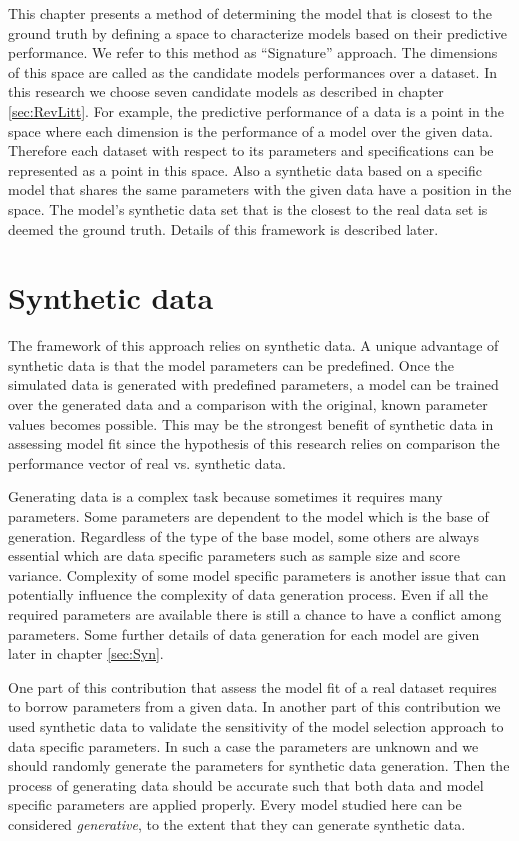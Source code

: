 \label{sec:Approach}

This chapter presents a method of determining the model that is closest to the ground truth by defining a space to characterize models based on their predictive performance. We refer to this method as ``Signature'' approach. The dimensions of this space are called as the candidate models performances over a dataset. In this research we choose seven candidate models as described in chapter \ref{sec:RevLitt}. For example, the predictive performance of a data is a point in the space where each dimension is the performance of a model over the given data. Therefore each dataset with respect to its parameters and specifications can be represented as a point in this space. Also a synthetic data based on a specific model that shares the same parameters with the given data have a position in the space.  The model's synthetic data set that is the closest to the real data set is deemed the ground truth.  Details of this framework is described later. 

\section{Synthetic data}
The framework of this approach relies on synthetic data. A unique advantage of synthetic data is that the model parameters can be predefined. Once the simulated data is generated with predefined parameters, a model can be trained over the generated data and a comparison with the original, known parameter values becomes possible. This may be the strongest benefit of synthetic data in assessing model fit since the hypothesis of this research relies on comparison the performance vector of real vs. synthetic data.

Generating data is a complex task because sometimes it requires many parameters. Some parameters are dependent to the model which is the base of generation. Regardless of the type of the base model, some others are always essential which are data specific parameters such as sample size and score variance. Complexity of some model specific parameters is another issue that can potentially influence the complexity of data generation process. Even if all the required parameters are available there is still a chance to have a conflict among parameters. Some further details of data generation for each model are given later in chapter \ref{sec:Syn}. 

One part of this contribution that assess the model fit of a real dataset requires to borrow parameters from a given data. In another part of this contribution we used synthetic data to validate the sensitivity of the model selection approach to data specific parameters. In such a case the parameters are unknown and we should randomly generate the parameters for synthetic data generation. Then the process of generating data should be accurate such that both data  and model specific parameters are applied properly. Every model studied here can be considered \textit{generative}, to the extent that they can generate synthetic data.


